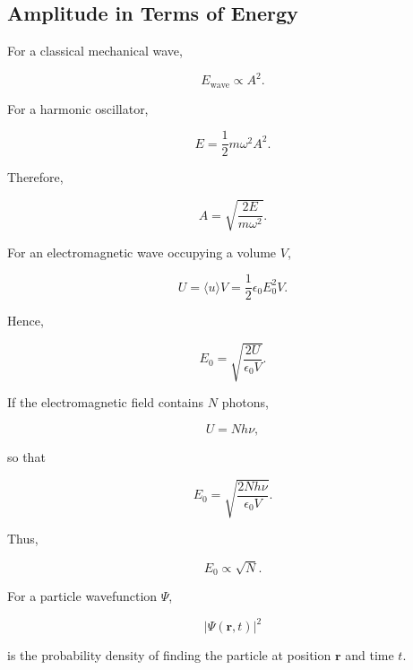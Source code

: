 \documentclass[12pt]{article}
\begin{document}
\subsection{Amplitude in Terms of Energy}

For a classical mechanical wave,

\begin{equation}
E_{\text{wave}}\propto A^2.
\end{equation}

For a harmonic oscillator,

\begin{equation}
E=\frac{1}{2}m\omega^2A^2.
\end{equation}

Therefore,

\begin{equation}
A=\sqrt{\frac{2E}{m\omega^2}}.
\end{equation}

For an electromagnetic wave occupying a volume $V$,

\begin{equation}
U=\langle u\rangle V=\frac{1}{2}\epsilon_0E_0^2V.
\end{equation}

Hence,

\begin{equation}
\boxed{E_0=\sqrt{\frac{2U}{\epsilon_0V}}}.
\end{equation}

If the electromagnetic field contains $N$ photons,

\begin{equation}
U=Nh\nu,
\end{equation}

so that

\begin{equation}
\boxed{E_0=\sqrt{\frac{2Nh\nu}{\epsilon_0V}}}.
\end{equation}

Thus,

\begin{equation}
E_0\propto \sqrt{N}.
\end{equation}

For a particle wavefunction $\Psi$,

\begin{equation}
\boxed{|\Psi(\mathbf r,t)|^2}
\end{equation}

is the probability density of finding the particle at position $\mathbf r$ and time $t$.
\end{document}
